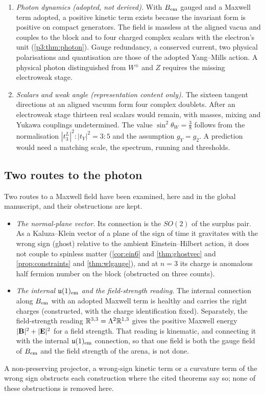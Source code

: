 \begin{enumerate}[label=(\arabic*),leftmargin=2.2em]
$Z$ massless (\cref{p2:prop:metastable}) and the plane $P_e$, which has the observed pattern, is a saddle (\cref{p2:sec:main}); no complete list of critical sets
is claimed. The electroweak mechanism is missing.
\item \emph{Photon dynamics (adopted, not derived).} With $B_{\rm em}$ gauged and a Maxwell term adopted, a positive kinetic term exists because the invariant
form is positive on compact generators. The field is massless at the aligned vacua and couples to the block and to four charged complex scalars with
the electron's unit (\cref{p3:thm:photon}). Gauge redundancy, a conserved current, two physical polarisations and quantisation are those of the adopted
Yang--Mills action. A physical photon distinguished from $W^\pm$ and $Z$ requires the missing electroweak stage.
\item \emph{Scalars and weak angle (representation content only).} The sixteen tangent directions at an aligned vacuum form four complex doublets. After an
electroweak stage thirteen real scalars would remain, with masses, mixing and Yukawa couplings undetermined. The value $\sin^2\theta_W=\tfrac38$
follows from the normalisation $|t^L_3|^2:|t_Y|^2=3:5$ and the assumption $g_Y=g_2$. A prediction would need a matching scale, the spectrum, running and
thresholds.
\end{enumerate}

\subsection{Two routes to the photon}

Two routes to a Maxwell field have been examined, here and in the global manuscript, and their obstructions are kept.
\begin{itemize}
\item \emph{The normal-plane vector.} Its connection is the $SO(2)$ of the surplus pair. As a Kaluza--Klein vector of a plane of the sign of time it
gravitates with the wrong sign (ghost) relative to the ambient Einstein--Hilbert action, it does not couple to spinless matter (\cref{cor:ein6} and \cref{thm:ghostvec} and \cref{prop:constraints} and \cref{thm:wlgauge}), and at $n=3$ its charge is anomalous half fermion
number on the block (obstructed on three counts).
\item \emph{The internal $\mathfrak{u}(1)_{\rm em}$ and the field-strength reading.} The internal connection along $B_{\rm em}$ with an adopted Maxwell term is healthy and
carries the right charges (constructed, with the charge identification fixed). Separately, the field-strength reading $\mathbb{R}^{3,3}=\Lambda^2\mathbb{R}^{1,3}$ gives the
positive Maxwell energy $|\mathbf B|^2+|\mathbf E|^2$ for a field strength. That reading is kinematic, and connecting it with the internal $\mathfrak{u}(1)_{\rm em}$ connection, so
that one field is both the gauge field of $B_{\rm em}$ and the field strength of the arena, is not done.
\end{itemize}
A non-preserving projector, a wrong-sign kinetic term or a curvature term of the wrong sign obstructs each construction where the cited theorems
say so; none of these obstructions is removed here.

